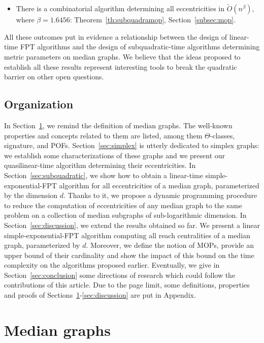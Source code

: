 \documentclass[a4paper,UKenglish,numberwithinsect,cleveref, autoref]{lipics-v2021}
\begin{document}
\begin{itemize}
    \item There is a combinatorial algorithm determining all eccentricities in $\tilde{O}(n^{\beta})$, where $\beta = 1.6456$: Theorem~\ref{th:subquadramop}, Section~\ref{subsec:mop}.
\end{itemize}

All these outcomes put in evidence a relationship between the design of linear-time FPT algorithms and the design of subquadratic-time algorithms determining metric parameters on median graphs. We believe that the ideas proposed to establish all these results represent interesting tools to break the quadratic barrier on other open questions.

\subsection{Organization}

In Section~\ref{sec:median}, we remind the definition of median graphs. The well-known properties and concepts related to them are listed, among them $\Theta$-classes, signature, and POFs. Section~\ref{sec:simplex} is utterly dedicated to simplex graphs: we establish some characterizations of these graphs and we present our quasilinear-time algorithm determining their eccentricities. In Section~\ref{sec:subquadratic}, we show how to obtain a linear-time simple-exponential-FPT algorithm for all eccentricities of a median graph, parameterized by the dimension $d$. Thanks to it, we propose a dynamic programming procedure to reduce the computation of eccentricities of any median graph to the same problem on a collection of median subgraphs of sub-logarithmic dimension. In Section~\ref{sec:discussion}, we extend the results obtained so far. We present a linear simple-exponential-FPT algorithm computing all reach centralities of a median graph, parameterized by $d$. Moreover, we define the notion of MOPs, provide an upper bound of their cardinality and show the impact of this bound on the time complexity on the algorithms proposed earlier. Eventually, we give in Section~\ref{sec:conclusion} some directions of research which could follow the contributions of this article. Due to the page limit, some definitions, properties and proofs of Sections~\ref{sec:median}-\ref{sec:discussion} are put in Appendix.

\section{Median graphs} \label{sec:median}
\end{document}
